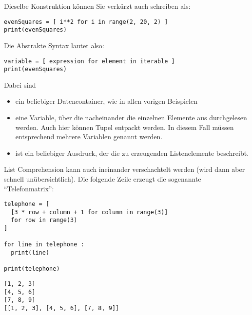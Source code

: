 \begin{cmdbox}
\end{cmdbox}

Dieselbe Konstruktion können Sie verkürzt auch schreiben als:
\begin{codebox}
\begin{verbatim}
evenSquares = [ i**2 for i in range(2, 20, 2) ]
print(evenSquares)
\end{verbatim}
\end{codebox}

Die Abstrakte Syntax lautet also:
\begin{codebox}
\begin{verbatim}
variable = [ expression for element in iterable ]
print(evenSquares)
\end{verbatim}
\end{codebox}
Dabei sind
\begin{itemize}
\item {} ein beliebiger Datencontainer, wie in allen vorigen Beispielen
\item {} eine Variable, über die nacheinander die einzelnen Elemente aus  durchgelesen werden. Auch hier können Tupel entpackt werden. In
	diesem Fall müssen entsprechend mehrere Variablen genannt werden.
\item {} ist ein beliebiger Ausdruck, der die zu erzeugenden Listenelemente beschreibt.
\end{itemize}

List Comprehension kann auch ineinander verschachtelt werden (wird dann aber schnell unübersichtlich). Die folgende Zeile erzeugt die sogenannte \enquote{Telefonmatrix}:

\begin{codebox}
\begin{verbatim}
telephone = [
  [3 * row + column + 1 for column in range(3)]
  for row in range(3)
]

for line in telephone :
  print(line)

print(telephone)
\end{verbatim}
\end{codebox}

\begin{cmdbox}
\begin{verbatim}
[1, 2, 3]
[4, 5, 6]
[7, 8, 9]
[[1, 2, 3], [4, 5, 6], [7, 8, 9]]
\end{verbatim}
\end{cmdbox}

